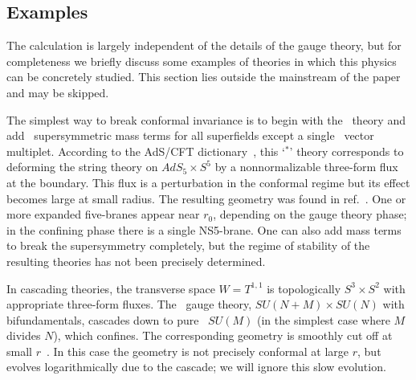 \subsection{Examples}

The calculation is largely independent of the details
of the gauge theory, but for completeness we briefly discuss some
examples of theories in which this physics can be
concretely studied.  This section lies outside the mainstream
of the paper and may be skipped.

The simplest way to break conformal invariance is to begin with the \nfour\
theory and add
\none\ supersymmetric mass terms for all
superfields except a single \none\ vector
multiplet.  According to the AdS/CFT dictionary~\cite{GKPW}, this
`\none$^*$' theory corresponds to deforming the string theory on $AdS_5 \times
S^5$ by a nonnormalizable three-form flux at the boundary.  This flux is a
perturbation in the conformal regime but its effect becomes large at small
radius.  The resulting geometry was found in ref.~\cite{PS}.  One or more
expanded five-branes appear near $r_0$, depending on the gauge
theory phase; in the
confining phase there is a single NS5-brane.  One can also add mass terms to
break the supersymmetry completely, but the regime of stability of the
resulting theories has not been precisely determined.

In cascading theories, the transverse space $W = T^{1,1}$ is topologically
$S^3 \times S^2$ with appropriate three-form fluxes.  The \none\ gauge theory,
$SU(N + M) \times SU(N)$ with bifundamentals, cascades down to pure \none\
$SU(M)$  (in the simplest case where $M$ divides $N$), which confines.  The
corresponding geometry is smoothly cut off at small $r$~\cite{ikms}.  In this
case the geometry is not precisely conformal at large $r$, but evolves
logarithmically due to the cascade; we will ignore this slow evolution.

